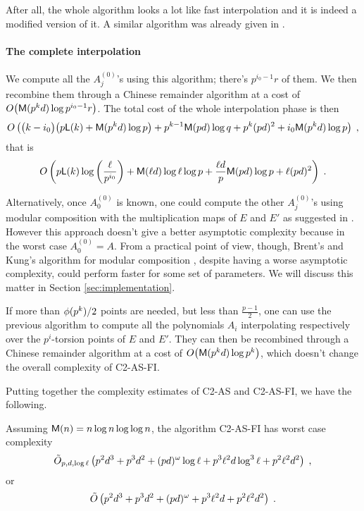 After all, the whole algorithm looks a lot like fast interpolation
\cite[$\S$10]{vzGG} and it is indeed a modified version of it. A
similar algorithm was already given in \cite{EnMo03}.


\paragraph{The complete interpolation}
We compute all the $A_j^{(0)}$'s using this algorithm; there's
$p^{i_0-1}r$ of them. We then recombine them through a Chinese
remainder algorithm at a cost of $O\bigl(\mathrm{\sf M}(p^kd)\log
p^{i_0-1}r\bigr)$. The total cost of the whole interpolation phase is
then
\begin{equation*}
  O\left(\bigl(k-i_0\bigr) \bigl(p{\sf L}(k) + \mathrm{\sf M}(p^kd)\log p\bigr) +
    p^{k-1}\mathrm{\sf M}(pd)\log q + p^k(pd)^2 + i_0\mathrm{\sf M}(p^kd)\log p
  \right)
  \;\text{,}
\end{equation*}
that is
\begin{equation}
  \label{eq:interp}
  O\left(p{\sf L}(k)\log\left(\frac{\ell}{p^{i_0}}\right) + 
    \mathrm{\sf M}(\ell d)\log\ell\log p +
    \frac{\ell d}{p}\mathrm{\sf M}(pd)\log p +
    \ell(pd)^2
  \right)
  \;\text{.}
\end{equation}

Alternatively, once $A_0^{(0)}$ is known, one could compute the other
$A_j^{(0)}$'s using modular composition with the multiplication maps
of $E$ and $E'$ as suggested in \cite{Cou96}. However this approach
doesn't give a better asymptotic complexity because in the worst case
$A_0^{(0)}=A$. From a practical point of view, though, Brent's and
Kung's algorithm for modular composition \cite{BrKu78}, despite having
a worse asymptotic complexity, could perform faster for some set of
parameters. We will discuss this matter in Section
\ref{sec:implementation}.

If more than $\phi(p^k)/2$ points are needed, but less than
$\frac{p-1}{2}$, one can use the previous algorithm to compute all the
polynomials $A_i$ interpolating respectively over the $p^i$-torsion
points of $E$ and $E'$. They can then be recombined through a Chinese
remainder algorithm at a cost of $O\bigl(\mathrm{\sf M}(p^kd)\log p^k\bigr)$,
which doesn't change the overall complexity of C2-AS-FI.


Putting together the complexity estimates of C2-AS and C2-AS-FI, we
have the following.

\begin{theorem}
  \label{th:complexity}
  Assuming $\mathrm{\sf M}(n) = n\log n\log\log n$, the algorithm C2-AS-FI has
  worst case complexity
  \begin{equation*}
    \tilde{O}_{p,d,\log\ell}\left(
      p^2d^3 +
      p^3d^2 +
      (pd)^\omega\log\ell +
      p^3\ell^2 d\log^3\ell + 
      p^2\ell^2 d^2
    \right)
    \;\text{,}
  \end{equation*}
  or
  \begin{equation*}
    \tilde{O}\left(
      p^2d^3 +
      p^3d^2 +
      (pd)^\omega +
      p^3\ell^2 d + 
      p^2\ell^2 d^2
    \right)
    \;\text{.}
  \end{equation*}
\end{theorem}



